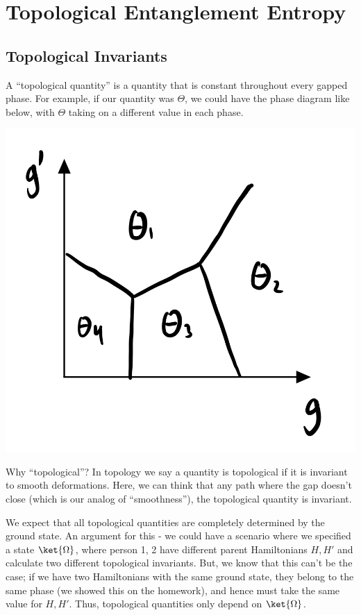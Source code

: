 \section{Topological Entanglement Entropy}

\subsection{Topological Invariants}
A ``topological quantity'' is a quantity that is constant throughout every gapped phase. For example, if our quantity was $\Theta$, we could have the phase diagram like below, with $\Theta$ taking on a different value in each phase.

\begin{center}
    \includegraphics[scale=0.35]{Lectures/Images/lec17-phases.png}
\end{center}

Why ``topological''? In topology we say a quantity is topological if it is invariant to smooth deformations. Here, we can think that any path where the gap doesn't close (which is our analog of ``smoothness''), the topological quantity is invariant.

We expect that all topological quantities are completely determined by the ground state. An argument for this - we could have a scenario where we specified a state $\ket{\Omega}$, where person 1, 2 have different parent Hamiltonians $H, H'$ and calculate two different topological invariants. But, we know that this can't be the case; if we have two Hamiltonians with the same ground state, they belong to the same phase (we showed this on the homework), and hence must take the same value for $H, H'$. Thus, topological quantities only depend on $\ket{\Omega}$.

